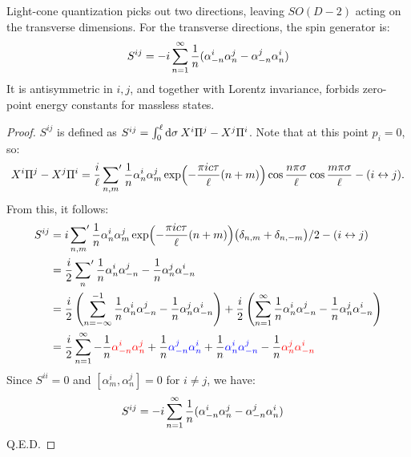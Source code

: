 Light-cone quantization picks out two directions, leaving $SO(D-2)$ acting on the transverse dimensions. For the transverse directions, the spin generator is: 
\begin{equation}
	S^{i j}=-i \sum_{n=1}^{\infty} \frac{1}{n}(\alpha_{-n}^{i} \alpha_{n}^{j}-\alpha_{-n}^{j} \alpha_{n}^{i})
\end{equation}
It is antisymmetric in $i, j$, and together with Lorentz invariance, forbids zero-point energy constants for massless states. 
\begin{tcolorbox}[breakable]
	\begin{proof}
		$S^{ij}$ is defined as $S^{ij}= \int_{0}^{\ell}\mathrm{d}\sigma\: X^{i}\Pi^{j}-X^{j}\Pi^{i}$. Note that at this point $p_{i}=0$, so:
		\begin{equation*}
			X^{i} \Pi^{j}-X^{j}\Pi^{i}=\frac{i}{\ell} \sideset{}{'}\sum_{n, m} \frac{1}{n} \alpha_{n}^{i} \alpha_{m}^{j} \exp \Bigl(-\frac{\pi i c \tau}{\ell}(n+m)\Bigr) \cos \frac{n \pi \sigma}{\ell} \cos \frac{m \pi \sigma}{\ell} -(i\leftrightarrow j). 
		\end{equation*}
		From this, it follows:
		\begin{align*}
			S^{ij}&=\mi\sideset{}{'}\sum_{n, m} \frac{1}{n} \alpha_{n}^{i} \alpha_{m}^{j} \exp \Bigl(-\frac{\pi \mi c \tau}{\ell}(n+m)\Bigr)\bigl(\delta_{n,m}+\delta_{n,-m}\bigr)/2-(i\leftrightarrow j) \\
			&=\frac{\mi}{2}\sideset{}{'}\sum_{n} \frac{1}{n} \alpha_{n}^{i} \alpha_{-n}^{j}-\frac{1}{n} \alpha_{n}^{j} \alpha_{-n}^{i}\\
			&=\frac{\mi}{2}\left(\sum_{n=-\infty}^{-1} \frac{1}{n} \alpha_{n}^{i} \alpha_{-n}^{j}-\frac{1}{n} \alpha_{n}^{j} \alpha_{-n}^{i}\right)+\frac{\mi}{2}\left(\sum_{n=1}^{\infty} \frac{1}{n} \alpha_{n}^{i} \alpha_{-n}^{j}-\frac{1}{n} \alpha_{n}^{j} \alpha_{-n}^{i}\right)\\
			&=\frac{\mi}{2}\sum_{n=1}^{\infty} -\frac{1}{n}\mathcolor{red}{\alpha_{-n}^{i} \alpha_{n}^{j}}+\frac{1}{n}\mathcolor{blue}{ \alpha_{-n}^{j} \alpha_{n}^{i}}+ \frac{1}{n} \mathcolor{blue}{\alpha_{n}^{i} \alpha_{-n}^{j}}-\frac{1}{n} \mathcolor{red}{\alpha_{n}^{j} \alpha_{-n}^{i}}
		\end{align*}
		Since $S^{ii}=0$ and $[\alpha^i_m,\alpha^j_n]=0$ for $i\ne j$, we have:
		\begin{align*}
			S^{ij}&=-i\sum_{n=1}^{\infty} \frac{1}{n} (\alpha_{-n}^{i} \alpha_{n}^{j}- \alpha_{-n}^{j} \alpha_{n}^{i})
		\end{align*}
		Q.E.D. 
	\end{proof}
\end{tcolorbox}

